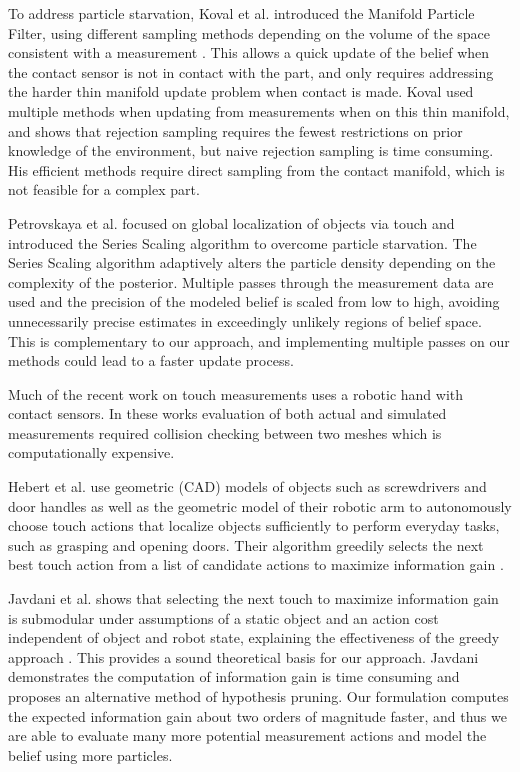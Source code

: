 \documentclass[../thesis.tex]{subfiles}
\begin{document}
To address particle starvation, Koval et al. introduced the Manifold Particle Filter, using different sampling methods depending on the volume of the space consistent with a measurement \cite{Koval2011, Koval2013}. 
This allows a quick update of the belief when the contact sensor is not in contact with the part, and only requires addressing the harder thin manifold update problem when contact is made. 
Koval used multiple methods when updating from measurements when on this thin manifold, and shows that rejection sampling requires the fewest restrictions on prior knowledge of the environment, but naive rejection sampling is time consuming.
His efficient methods require direct sampling from the contact manifold, which is not feasible for a complex part.

Petrovskaya et al. focused on global localization of objects via touch \cite{Petrovskaya2011} and introduced the Series Scaling algorithm to overcome particle starvation. 
The Series Scaling algorithm adaptively alters the particle density depending on the complexity of the posterior. 
Multiple passes through the measurement data are used and the precision of the modeled belief is scaled from low to high, avoiding unnecessarily precise estimates in exceedingly unlikely regions of belief space. 
This is complementary to our approach, and implementing multiple passes on our methods could lead to a faster update process.

Much of the recent work on touch measurements uses a robotic hand with contact sensors. In these works evaluation of both actual and simulated measurements required collision checking between two meshes which is computationally expensive. 


Hebert et al. use geometric (CAD) models of objects such as screwdrivers and door handles as well as the geometric model of their robotic arm to autonomously choose touch actions that localize objects sufficiently to perform everyday tasks, such as grasping and opening doors. 
Their algorithm greedily selects the next best touch action from a list of candidate actions to maximize information gain \cite{Hebert2013}.


Javdani et al. shows that selecting the next touch to maximize information gain is submodular under assumptions of a static object and an action cost independent of object and robot state, explaining the effectiveness of the greedy approach \cite{Javdani2013}. 
This provides a sound theoretical basis for our approach.
Javdani demonstrates the computation of information gain is time consuming and proposes an alternative method of hypothesis pruning. 
Our formulation computes the expected information gain about two orders of magnitude faster, and thus we are able to evaluate many more potential measurement actions and model the belief using more particles.
\end{document}
